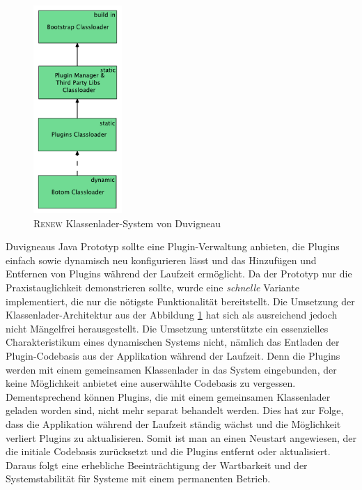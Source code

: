		\begin{figure}[h!]
		\centering
			\includegraphics[width=0.3\textwidth]{material/images/Classloader-Hierarhie-Renew.pdf}
			\caption{\textsc{Renew} Klassenlader-System von Duvigneau \cite{Duvigneau09}}
			\label{fig:classLoadDuv}
		\end{figure}\bigbreak
		Duvigneaus Java Prototyp \cite{Duvigneau09} sollte eine Plugin-Verwaltung anbieten, die Plugins einfach sowie dynamisch neu konfigurieren lässt und das Hinzufügen und Entfernen von Plugins während der Laufzeit ermöglicht. Da der Prototyp nur die Praxistauglichkeit demonstrieren sollte, wurde eine \textit{schnelle} Variante implementiert, die nur die nötigste Funktionalität bereitstellt. Die Umsetzung der Klassenlader-Architektur aus der Abbildung \ref{fig:classLoadDuv} hat sich als ausreichend jedoch nicht Mängelfrei herausgestellt. Die Umsetzung unterstützte ein essenzielles Charakteristikum eines dynamischen Systems nicht, nämlich das Entladen der Plugin-Codebasis aus der Applikation während der Laufzeit. Denn die Plugins werden mit einem gemeinsamen Klassenlader in das System eingebunden, der keine Möglichkeit anbietet eine auserwählte Codebasis zu vergessen. Dementsprechend können Plugins, die mit einem gemeinsamen Klassenlader geladen worden sind, nicht mehr separat behandelt werden. Dies hat zur Folge, dass die Applikation während der Laufzeit ständig wächst und die Möglichkeit verliert Plugins zu aktualisieren. Somit ist man an einen Neustart angewiesen, der die initiale Codebasis zurücksetzt und die Plugins entfernt oder aktualisiert. Daraus folgt eine erhebliche Beeinträchtigung der Wartbarkeit und der Systemstabilität für Systeme mit einem permanenten Betrieb. \bigbreak
